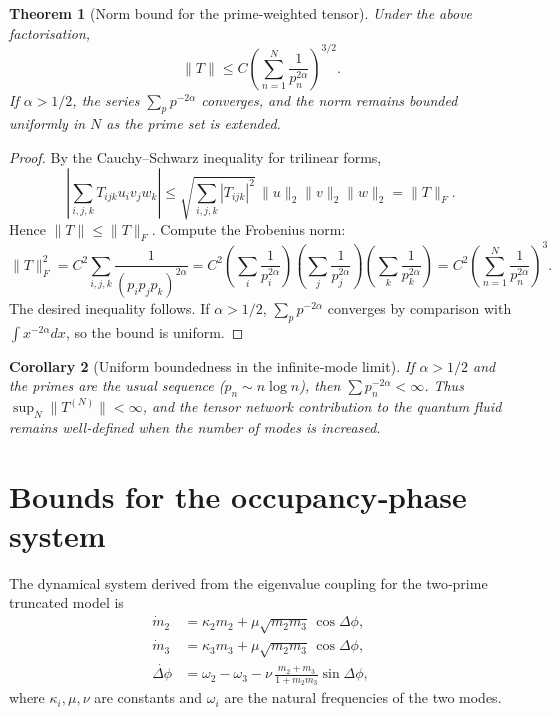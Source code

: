 \documentclass[11pt,a4paper]{article}
\newtheorem{theorem}{Theorem}[section]
\newtheorem{corollary}[theorem]{Corollary}
\theoremstyle{definition}
\theoremstyle{remark}
\newcommand{\norm}[1]{\|#1\|}
\newcommand{\abs}[1]{|#1|}
\begin{document}
\begin{theorem}[Norm bound for the prime‑weighted tensor]
Under the above factorisation,
\[
\norm{T} \le C \left( \sum_{n=1}^N \frac{1}{p_n^{2\alpha}} \right)^{3/2}.
\]
If \(\alpha > 1/2\), the series \(\sum_{p} p^{-2\alpha}\) converges, and the norm remains bounded uniformly in \(N\) as the prime set is extended.
\end{theorem}
\begin{proof}
By the Cauchy–Schwarz inequality for trilinear forms,
\[
\abs{\sum_{i,j,k} T_{ijk} u_i v_j w_k} \le \sqrt{\sum_{i,j,k} |T_{ijk}|^2}\, \|u\|_2\|v\|_2\|w\|_2 = \|T\|_F.
\]
Hence \(\norm{T} \le \|T\|_F\).  Compute the Frobenius norm:
\[
\|T\|_F^2 = C^2 \sum_{i,j,k} \frac{1}{(p_i p_j p_k)^{2\alpha}} = C^2 \left(\sum_i \frac{1}{p_i^{2\alpha}}\right)\left(\sum_j \frac{1}{p_j^{2\alpha}}\right)\left(\sum_k \frac{1}{p_k^{2\alpha}}\right) = C^2 \left(\sum_{n=1}^N \frac{1}{p_n^{2\alpha}}\right)^3.
\]
The desired inequality follows.  
If \(\alpha>1/2\), \(\sum_p p^{-2\alpha}\) converges by comparison with \(\int x^{-2\alpha}dx\), so the bound is uniform.
\end{proof}

\begin{corollary}[Uniform boundedness in the infinite‑mode limit]
If \(\alpha > 1/2\) and the primes are the usual sequence (\(p_n \sim n\log n\)), then \(\sum p_n^{-2\alpha} < \infty\).  
Thus \(\sup_N \norm{T^{(N)}} < \infty\), and the tensor network contribution to the quantum fluid remains well‑defined when the number of modes is increased.
\end{corollary}

\section{Bounds for the occupancy‑phase system}
\label{sec:occupancy}

The dynamical system derived from the eigenvalue coupling for the two‑prime truncated model is
\begin{align}
\dot m_2 &= \kappa_2 m_2 + \mu \sqrt{m_2 m_3}\,\cos\Delta\phi,\label{eq:occup2}\\
\dot m_3 &= \kappa_3 m_3 + \mu \sqrt{m_2 m_3}\,\cos\Delta\phi,\label{eq:occup3}\\
\dot{\Delta\phi} &= \omega_2 - \omega_3 - \nu\,\frac{m_2+m_3}{1+m_2 m_3}\sin\Delta\phi,\label{eq:phase}
\end{align}
where \(\kappa_i,\mu,\nu\) are constants and \(\omega_i\) are the natural frequencies of the two modes.
\end{document}
